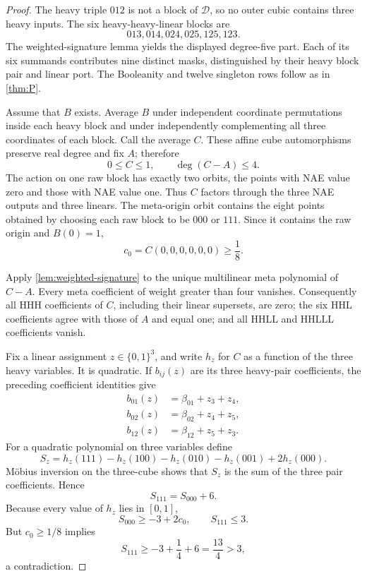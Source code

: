 \documentclass[11pt]{article}
\theoremstyle{definition}
\newcommand{\cube}[1]{\{0,1\}^{#1}}
\begin{document}
\begin{proof}
The heavy triple \(012\) is not a block of \(\mathcal D\), so no outer cubic
contains three heavy inputs.  The six heavy-heavy-linear blocks are
\[
 013,014,024,025,125,123.
\]
The weighted-signature lemma yields the displayed degree-five part.  Each of
its six summands contributes nine distinct masks, distinguished by their heavy
block pair and linear port.  The Booleanity and twelve singleton rows follow as
in \cref{thm:P}.

Assume that \(B\) exists.  Average \(B\) under independent coordinate
permutations inside each heavy block and under independently complementing all
three coordinates of each block.  Call the average \(C\).  These affine cube
automorphisms preserve real degree and fix \(A\); therefore
\[
 0\le C\le1,\qquad \deg(C-A)\le4.
\]
The action on one raw block has exactly two orbits, the points with NAE value
zero and those with NAE value one.  Thus \(C\) factors through the three NAE
outputs and three linears.  The meta-origin orbit contains the eight points
obtained by choosing each raw block to be \(000\) or \(111\).  Since it contains
the raw origin and \(B(0)=1\),
\[
 c_0=C(0,0,0,0,0,0)\ge\frac18.
\]

Apply \cref{lem:weighted-signature} to the unique multilinear meta polynomial
of \(C-A\).  Every meta coefficient of weight greater than four vanishes.
Consequently all HHH coefficients of \(C\), including their linear supersets,
are zero; the six HHL coefficients agree with those of \(A\) and equal one;
and all HHLL and HHLLL coefficients vanish.

Fix a linear assignment \(z\in\cube3\), and write \(h_z\) for \(C\) as a
function of the three heavy variables.  It is quadratic.  If
\(b_{ij}(z)\) are its three heavy-pair coefficients, the preceding coefficient
identities give
\[
\begin{aligned}
 b_{01}(z)&=\beta_{01}+z_3+z_4,\\
 b_{02}(z)&=\beta_{02}+z_4+z_5,\\
 b_{12}(z)&=\beta_{12}+z_5+z_3.
\end{aligned}
\]
For a quadratic polynomial on three variables define
\[
 S_z=h_z(111)-h_z(100)-h_z(010)-h_z(001)+2h_z(000).
\]
M\"obius inversion on the three-cube shows that \(S_z\) is the sum of the
three pair coefficients.  Hence
\[
 S_{111}=S_{000}+6.
\]
Because every value of \(h_z\) lies in \([0,1]\),
\[
 S_{000}\ge-3+2c_0,
 \qquad S_{111}\le3.
\]
But \(c_0\ge1/8\) implies
\[
 S_{111}\ge-3+\frac14+6=\frac{13}{4}>3,
\]
a contradiction.
\end{proof}
\end{document}
